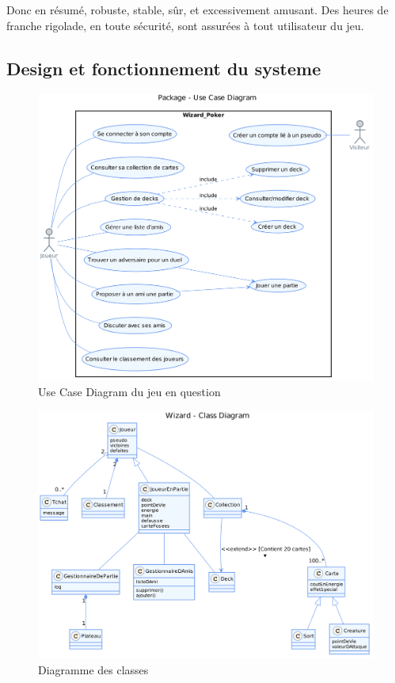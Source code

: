 \documentclass[11pt,a4paper]{article}
\begin{document}
Donc en résumé, robuste, stable, sûr, et excessivement amusant. Des
heures de franche rigolade, en toute sécurité, sont assurées à tout
utilisateur du jeu.

\subsection{Design et fonctionnement du systeme}
\label{sec:design}


\begin{figure}[ht]
  \centering
  \includegraphics[width=1\textwidth]{uml_files/UseCaseDiagram.png}
  \caption{\label{fig:usecase} Use Case Diagram du jeu en question}
\end{figure}

\begin{figure}[ht]
  \centering
  \includegraphics[width=1\textwidth]{uml_files/ClassDiagram.png}
  \caption{\label{fig:class} Diagramme des classes}
\end{figure}
\end{document}
